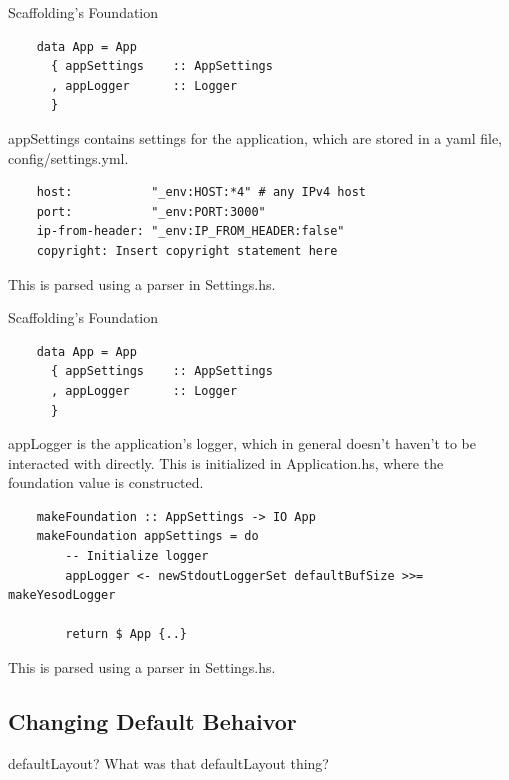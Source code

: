 \documentclass[pdf]{beamer}
\begin{document}
\begin{frame}[fragile]{Scaffolding's Foundation}
  \begin{verbatim}
    data App = App
      { appSettings    :: AppSettings
      , appLogger      :: Logger
      }
  \end{verbatim}
  \pause
  appSettings contains settings for the application, which are stored
  in a yaml file, config/settings.yml.
  \pause
  \begin{verbatim}
    host:           "_env:HOST:*4" # any IPv4 host
    port:           "_env:PORT:3000"
    ip-from-header: "_env:IP_FROM_HEADER:false"
    copyright: Insert copyright statement here
  \end{verbatim}

  This is parsed using a parser in Settings.hs.
\end{frame}

\begin{frame}[fragile]{Scaffolding's Foundation}
  \begin{verbatim}
    data App = App
      { appSettings    :: AppSettings
      , appLogger      :: Logger
      }
  \end{verbatim}

  appLogger is the application's logger, which in general doesn't
  haven't to be interacted with directly. This is initialized in
  Application.hs, where the foundation value is constructed.

  \begin{verbatim}
    makeFoundation :: AppSettings -> IO App
    makeFoundation appSettings = do
        -- Initialize logger
        appLogger <- newStdoutLoggerSet defaultBufSize >>= makeYesodLogger

        return $ App {..}
  \end{verbatim}

  This is parsed using a parser in Settings.hs.
\end{frame}

\subsection{Changing Default Behaivor}
\begin{frame}{defaultLayout?}
  What was that defaultLayout thing?
\end{frame}
\end{document}
